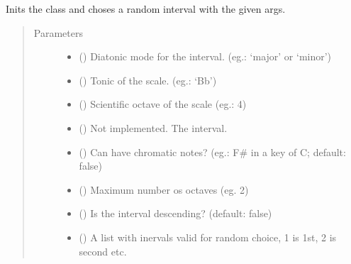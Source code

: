 \documentclass[letterpaper,10pt,english]{sphinxmanual}
\begin{document}
\begin{fulllineitems}
\begin{fulllineitems}
\label{\detokenize{index:birdears.interval.ChromaticInterval.__init__}}
Inits the class and choses a random interval with the given args.
\begin{quote}\begin{description}
\item[{Parameters}] \leavevmode\begin{itemize}
\item {} 
 () \textendash{} Diatonic mode for the interval.
(eg.: ‘major’ or ‘minor’)

\item {} 
 () \textendash{} Tonic of the scale. (eg.: ‘Bb’)

\item {} 
 () \textendash{} Scientific octave of the scale (eg.: 4)

\item {} 
 () \textendash{} Not implemented. The interval.

\item {} 
 () \textendash{} Can have chromatic notes? (eg.: F\# in a key
of C; default: false)

\item {} 
 () \textendash{} Maximum number os octaves (eg. 2)

\item {} 
 () \textendash{} Is the interval descending? (default: false)

\item {} 
 () \textendash{} A list with inervals valid for random
choice, 1 is 1st, 2 is second etc.

\end{itemize}

\end{description}\end{quote}

\end{fulllineitems}


\end{fulllineitems}
\end{document}
